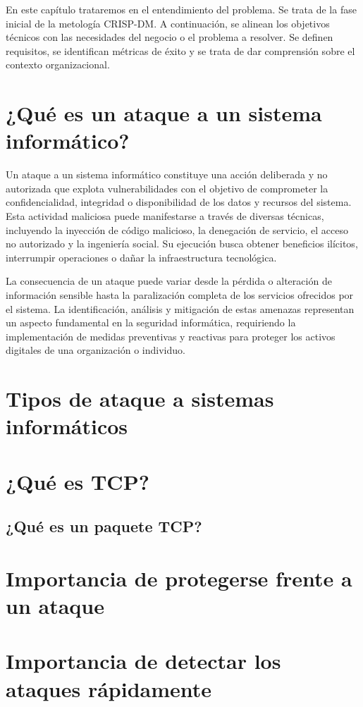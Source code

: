 En este capítulo trataremos en el entendimiento del problema. Se trata de la fase inicial de la metología CRISP-DM. A continuación, se alinean los objetivos técnicos con las necesidades del negocio o el problema a resolver. Se definen requisitos, se identifican métricas de éxito y se trata de dar comprensión sobre el contexto organizacional.


\section{¿Qué es un ataque a un sistema informático?}
Un ataque a un sistema informático constituye una acción deliberada y no autorizada que explota vulnerabilidades con el objetivo de comprometer la confidencialidad, integridad o disponibilidad de los datos y recursos del sistema. Esta actividad maliciosa puede manifestarse a través de diversas técnicas, incluyendo la inyección de código malicioso, la denegación de servicio, el acceso no autorizado y la ingeniería social. Su ejecución busca obtener beneficios ilícitos, interrumpir operaciones o dañar la infraestructura tecnológica.

La consecuencia de un ataque puede variar desde la pérdida o alteración de información sensible hasta la paralización completa de los servicios ofrecidos por el sistema. La identificación, análisis y mitigación de estas amenazas representan un aspecto fundamental en la seguridad informática, requiriendo la implementación de medidas preventivas y reactivas para proteger los activos digitales de una organización o individuo.

\section{Tipos de ataque a sistemas informáticos}


\section{¿Qué es TCP?}
\subsection{¿Qué es un paquete TCP?}
\section{Importancia de protegerse frente a un ataque}
\section{Importancia de detectar los ataques rápidamente}


